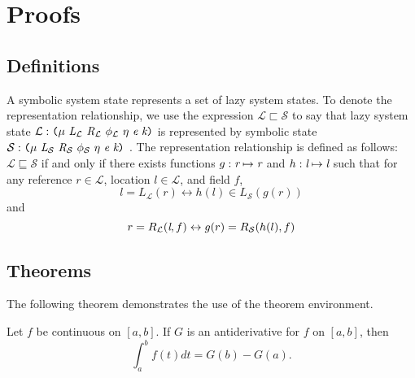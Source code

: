 \section{Proofs}

\subsection{Definitions}

\begin{definition}
A symbolic system state represents a set of lazy system states. To denote the representation relationship, we use the expression $\mathcal{L}\sqsubset \mathcal{S} $ to say that lazy system state $\mathcal{L}:\lp \mu\ \cfgnt{L}_{\mathcal{L}}\ \cfgnt{R}_{\mathcal{L}}\ \phi_{\mathcal{L}}\ \eta\ \cfgnt{e}\ \cfgnt{k}\rp$ is represented by symbolic state $\mathcal{S}:\lp \mu\ \cfgnt{L}_{\mathcal{S}}\ \cfgnt{R}_{\mathcal{S}}\ \phi_{\mathcal{S}}\ \eta\ \cfgnt{e}\ \cfgnt{k}\rp$ . The representation relationship is defined as follows: $\mathcal{L}\sqsubseteq \mathcal{S} $ if and only if there exists functions $g:\emph{r} \mapsto \emph{r}$ and $h:\emph{l} \mapsto \emph{l}$ such that for any reference $r \in \mathcal{L}$, location $l \in \mathcal{L}$, and field $f$, $$ l = L_{\mathcal{L}}(r) \leftrightarrow h(l)\in L_{\mathcal{S}}(g(r))$$ and $$ r = R_{\mathcal{L}}(\emph{l},f) \leftrightarrow g(r) = R_{\mathcal{S}}(h(l),f)$$
\end{definition}

\subsection{Theorems}
The following theorem demonstrates the use of the theorem environment.
\begin{theorem}
Let $f$ be continuous on $[a,b]$.  If $G$ is
an antiderivative for $f$ on $[a,b]$, then
\begin{displaymath}\int^b_af(t)dt = G(b) - G(a).\end{displaymath}
\end{theorem}


